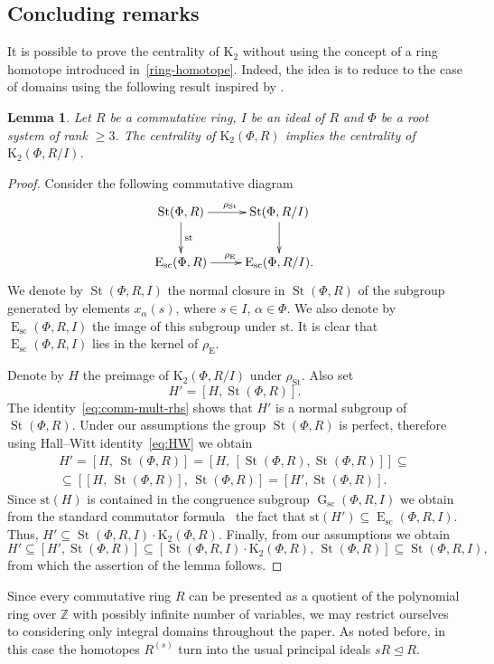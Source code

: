 \documentclass[oneside, 11pt]{amsart}
\numberwithin{equation}{section}
\newtheorem{lemma}{Lemma} \numberwithin{lemma}{section}
\theoremstyle{definition}
\theoremstyle{remark}
\DeclareMathOperator\St{St}
\DeclareMathOperator\GG{G}
\DeclareMathOperator\E{E}
\newcommand{\ZZ}{\mathbb{Z}}
\begin{document}
 \subsection{Concluding remarks} \label{no-homotopes}
 It is possible to prove the centrality of $\mathrm{K}_2$ without using the concept of a ring homotope introduced in~\cref{ring-homotope}.
 Indeed, the idea is to reduce to the case of domains using the following result inspired by \cite[Lemma~5.3]{St99}.
 \begin{lemma} Let $R$ be a commutative ring, $I$ be an ideal of $R$ and $\Phi$ be a root system of rank $\geq 3$.
 The centrality of $\mathrm{K}_2(\Phi, R)$ implies the centrality of $\mathrm K_2(\Phi, R/I)$. \end{lemma}
 \begin{proof} Consider the following commutative diagram
 \[\xymatrix{\St(\Phi, R) \ar[r]^{\rho_\mathrm{St}} \ar[d]^{\mathrm{st}} & \St(\Phi, R/I) \ar[d] \\ \mathrm{E}_{\mathrm{sc}}(\Phi,R) \ar[r]^{\rho_\mathrm{E}} & \mathrm{E}_{\mathrm{sc}}(\Phi, R/I).}\]
 We denote by $\St(\Phi, R, I)$ the normal closure in $\St(\Phi, R)$ of the subgroup generated by elements $x_\alpha(s)$, where $s\in I$, $\alpha\in\Phi$. We also denote by $\E_{\mathrm{sc}}(\Phi, R, I)$ the image of this subgroup under $\mathrm{st}$.
 It is clear that $\E_\mathrm{sc}(\Phi, R, I)$ lies in the kernel of $\rho_\mathrm{E}$.
 
 Denote by $H$ the preimage of $\mathrm{K}_2(\Phi, R/I)$ under $\rho_\mathrm{St}$. Also set \[H'=[H, \St(\Phi, R)].\] The identity~\eqref{eq:comm-mult-rhs} shows that $H'$ is a normal subgroup of $\St(\Phi, R)$. Under our assumptions the group $\St(\Phi, R)$ is perfect, therefore using Hall--Witt identity~\eqref{eq:HW} we obtain 
 \begin{multline}\nonumber H' = [H,\, \St(\Phi, R)] = \left[H,\, [\St(\Phi, R), \St(\Phi, R)]\right] \subseteq \\ \subseteq \left[[H,\, \St(\Phi, R)],\, \St(\Phi, R)\right] = [H', \St(\Phi, R)]. \end{multline} 
 Since $\mathrm{st}(H)$ is contained in the congruence subgroup $\GG_\mathrm{sc}(\Phi, R, I)$ we obtain from the standard commutator formula~\cite[Theorem~1]{Va86} the fact that $\mathrm{st}(H')\subseteq\E_\mathrm{sc}(\Phi, R, I)$. Thus, $H'\subseteq \St(\Phi, R, I) \cdot \mathrm{K}_2(\Phi, R)$. Finally, from our assumptions we obtain 
 \[H' \subseteq [H', \St(\Phi, R)] \subseteq [\St(\Phi, R, I)\cdot \mathrm{K}_2(\Phi, R),\, \St(\Phi, R)] \subseteq \St(\Phi,R,I),\] from which the assertion of the lemma follows.
 \end{proof}
 Since every commutative ring $R$ can be presented as a quotient of the polynomial ring over $\ZZ$ with possibly infinite number of variables,
  we may restrict ourselves to considering only integral domains throughout the paper.
 As noted before, in this case the homotopes $R^{(s)}$ turn into the usual principal ideals $sR \trianglelefteq R$.
 
\printbibliography
\end{document}
